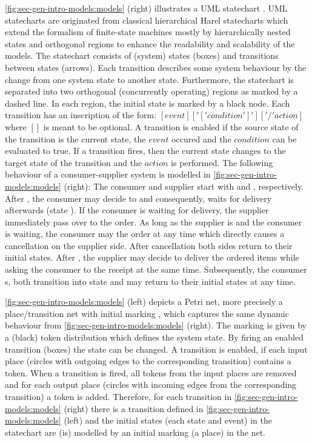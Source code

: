 \cref{fig:sec-gen-intro-models:models} (right) illustrates a UML statechart \cite{UML15,Rumbaugh:2004:UML:993859}.
UML statecharts are originated from classical hierarchical Harel statecharts \cite{HAREL1987231,Harel2005} which extend the formalism of finite-state machines \cite{Dathan2015} mostly by hierarchically nested states and orthogonal regions to enhance the readability and scalability of the models.
The statechart consists of (system) states (boxes) and transitions between states (arrows).
Each transition describes some system behaviour by the change from one system state to another state.
Furthermore, the statechart is separated into two orthogonal (concurrently operating) regions as marked by a dashed line.
In each region, the initial state is marked by a black node.
Each transition has an inscription of the form: $[event]['['condition']']['/'action]$ where $[]$ is meant to be optional.
A transition is enabled if the source state of the transition is the current state, the $event$ occured and the $condition$ can be evaluated to true.
If a transition fires, then the current state changes to the target state of the transition and the $action$ is performed.
The following behaviour of a consumer-supplier system is modelled in \cref{fig:sec-gen-intro-models:models} (right):
The consumer and supplier start with  and , respectively.
After , the consumer may decide to  and consequently, waits for delivery afterwards (state ).
If the consumer is waiting for delivery, the supplier immediately pass over to  the order.
As long as the supplier is  and the consumer is waiting, the consumer may  the order at any time which directly causes a cancellation on the supplier side.
After cancellation both sides return to their initial states.
After , the supplier may decide to deliver the ordered items while asking the consumer to  the receipt at the same time.
Subsequently, the consumer s, both transition into state  and may return to their initial states at any time.
 
\cref{fig:sec-gen-intro-models:models} (left) depicts a Petri net, more precisely a place/transition net with initial marking \cite{NIELSEN19923,Reisig:1985:PNI:3405}, which captures the same dynamic behaviour from \cref{fig:sec-gen-intro-models:models} (right).
The marking is given by a (black) token distribution which defines the system state.
By firing an enabled transition (boxes) the state can be changed.
A transition is enabled, if each input place (circles with outgoing edges to the corresponding transition) contains a token.
When a transition is fired, all tokens from the input places are removed and for each output place (circles with incoming edges from the corresponding transition) a token is added.
Therefore, for each transition in \cref{fig:sec-gen-intro-models:models} (right) there is a transition defined in \cref{fig:sec-gen-intro-models:models} (left) and the initial states (each state and event) in the statechart are (is) modelled by an initial marking (a place) in the net.

